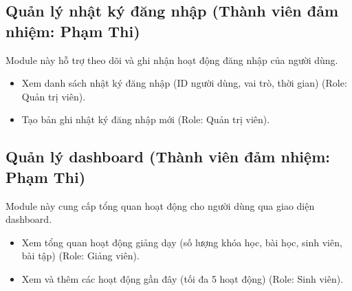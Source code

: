 \subsection{Quản lý nhật ký đăng nhập (Thành viên đảm nhiệm: Phạm Thi)}
Module này hỗ trợ theo dõi và ghi nhận hoạt động đăng nhập của người dùng.
\begin{itemize}[label=--]
    \item Xem danh sách nhật ký đăng nhập (ID người dùng, vai trò, thời gian) (Role: Quản trị viên).
    \item Tạo bản ghi nhật ký đăng nhập mới (Role: Quản trị viên).
\end{itemize}

\subsection{Quản lý dashboard (Thành viên đảm nhiệm: Phạm Thi)}
Module này cung cấp tổng quan hoạt động cho người dùng qua giao diện dashboard.
\begin{itemize}[label=--]
    \item Xem tổng quan hoạt động giảng dạy (số lượng khóa học, bài học, sinh viên, bài tập) (Role: Giảng viên).
    \item Xem và thêm các hoạt động gần đây (tối đa 5 hoạt động) (Role: Sinh viên).
\end{itemize}